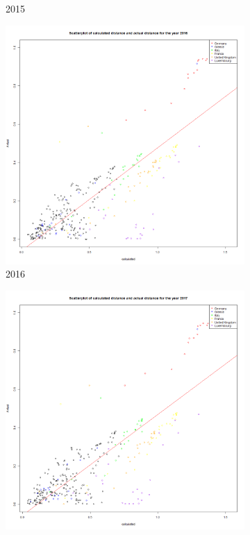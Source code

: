 \documentclass[a4paper,twoside,10pt]{article}
\begin{document}
\begin{figure}[H]
\begin{subfigure}[b]{0.3\textwidth}
			\caption{2015}
		\end{subfigure}
		\hfill
		\begin{subfigure}[b]{0.3\textwidth}
			\centering
			\includegraphics[width=\textwidth]{images/scatterplot_with_regression_line_ 2016 .png}
			\caption{2016}
		\end{subfigure}
		\begin{subfigure}[b]{0.3\textwidth}
			\centering
			\includegraphics[width=\textwidth]{images/scatterplot_with_regression_line_ 2017 .png}

\end{subfigure}
\end{figure}
\end{document}
